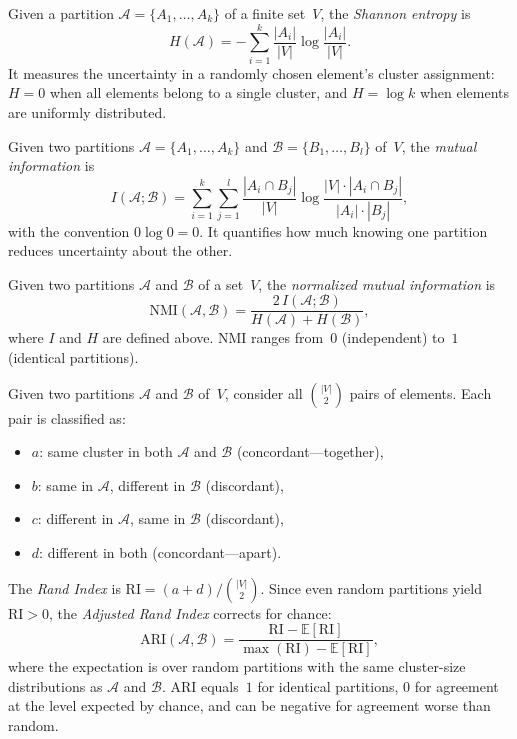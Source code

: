 \begin{definition}
\label{def:shannon-entropy}
Given a partition $\mathcal{A} = \{A_1, \ldots, A_k\}$ of a finite set~$V$, the \emph{Shannon entropy} is
\[
  H(\mathcal{A}) = -\sum_{i=1}^{k} \frac{|A_i|}{|V|} \log \frac{|A_i|}{|V|}.
\]
It measures the uncertainty in a randomly chosen element's cluster assignment: $H = 0$ when all elements belong to a single cluster, and $H = \log k$ when elements are uniformly distributed.
\end{definition}

\begin{definition}
\label{def:mutual-information}
Given two partitions $\mathcal{A} = \{A_1, \ldots, A_k\}$ and $\mathcal{B} = \{B_1, \ldots, B_l\}$ of~$V$, the \emph{mutual information} is
\[
  I(\mathcal{A}; \mathcal{B}) = \sum_{i=1}^{k} \sum_{j=1}^{l} \frac{|A_i \cap B_j|}{|V|} \log \frac{|V| \cdot |A_i \cap B_j|}{|A_i| \cdot |B_j|},
\]
with the convention $0 \log 0 = 0$. It quantifies how much knowing one partition reduces uncertainty about the other.
\end{definition}

\begin{definition}
\label{def:nmi}
Given two partitions $\mathcal{A}$ and $\mathcal{B}$ of a set~$V$, the \emph{normalized mutual information} is
\[
  \mathrm{NMI}(\mathcal{A}, \mathcal{B}) = \frac{2\, I(\mathcal{A}; \mathcal{B})}{H(\mathcal{A}) + H(\mathcal{B})},
\]
where $I$ and $H$ are defined above. NMI ranges from~$0$ (independent) to~$1$ (identical partitions).
\end{definition}

\begin{definition}
\label{def:ari}
Given two partitions $\mathcal{A}$ and $\mathcal{B}$ of~$V$, consider all $\binom{|V|}{2}$ pairs of elements. Each pair is classified as:
\begin{itemize}
\item $a$: same cluster in both $\mathcal{A}$ and $\mathcal{B}$ (concordant---together),
\item $b$: same in $\mathcal{A}$, different in $\mathcal{B}$ (discordant),
\item $c$: different in $\mathcal{A}$, same in $\mathcal{B}$ (discordant),
\item $d$: different in both (concordant---apart).
\end{itemize}
The \emph{Rand Index} is $\mathrm{RI} = (a + d) / \binom{|V|}{2}$. Since even random partitions yield $\mathrm{RI} > 0$, the \emph{Adjusted Rand Index} corrects for chance:
\[
  \mathrm{ARI}(\mathcal{A}, \mathcal{B}) = \frac{\mathrm{RI} - \mathbb{E}[\mathrm{RI}]}{\max(\mathrm{RI}) - \mathbb{E}[\mathrm{RI}]},
\]
where the expectation is over random partitions with the same cluster-size distributions as $\mathcal{A}$ and $\mathcal{B}$. ARI equals~$1$ for identical partitions, $0$ for agreement at the level expected by chance, and can be negative for agreement worse than random.
\end{definition}

